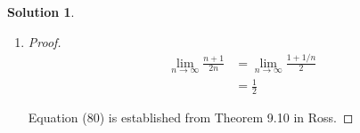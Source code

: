\documentclass[12pt]{article}
\theoremstyle{definition} %
\newtheorem{solution}{Solution}
\theoremstyle{plain} %
\begin{document}
\begin{solution}
\begin{enumerate}
\begin{proof}
            The inductive step:
            \begin{align}
                t_{n+1} &= \frac{(n+1) + 1}{2(n+1)} \tag{74} \\
                &= \frac{n + 2}{2(n+1)} \tag{75} \\
                &= \left[ 1 - \frac{1}{(n+1)^2} \right] t_n \tag{76} \\
                &= \left[ 1 - \frac{1}{(n+1)^2} \right] \left( \frac{n+1}{2n} \right) \tag{77} \\
                &= \frac{(n+1)^2 (n+1)}{2n(n+1)^2} - \frac{n+1}{2n(n+1)^2} \tag{78} \\
                &= \frac{n+2}{2(n+1)} \tag{79}
            \end{align}
        
            Thus, the proof is complete.
        \end{proof}
        \item \begin{proof}
            \begin{align}
                \lim_{n \to \infty} \frac{n + 1}{2n} &= \lim_{n \to \infty} \frac{1 + 1/n}{2} \tag{80} \\
                &= \frac{1}{2} \tag{81}
            \end{align}
        
            Equation (80) is established from Theorem 9.10 in Ross. 
        \end{proof} 
    \end{enumerate}
\end{solution}
\end{document}
